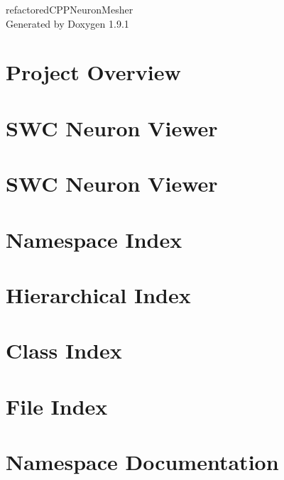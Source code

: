 \let\mypdfximage\pdfximage\def\pdfximage{\immediate\mypdfximage}\documentclass[twoside]{book}
\newcommand{\+}{\discretionary{\mbox{\scriptsize$\hookleftarrow$}}{}{}}
\newcommand{\clearemptydoublepage}{%
  \newpage{\pagestyle{empty}\cleardoublepage}%
}
\begin{document}
\raggedbottom

\hypersetup{pageanchor=false,
             bookmarksnumbered=true,
             pdfencoding=unicode
            }
\begin{titlepage}
\vspace*{7cm}
\begin{center}%
{\Large refactored\+CPPNeuron\+Mesher }\\
\vspace*{1cm}
{\large Generated by Doxygen 1.9.1}\\
\end{center}
\end{titlepage}
\clearemptydoublepage
{}
\tableofcontents
\clearemptydoublepage
{}
\hypersetup{pageanchor=true}

\chapter{Project Overview}
\label{index}\hypertarget{index}{}
\chapter{SWC Neuron Viewer}
\label{md_scripts_app_neuronviewer_README}

\chapter{SWC Neuron Viewer}
\label{md_scripts_README}

\chapter{Namespace Index}

\chapter{Hierarchical Index}

\chapter{Class Index}

\chapter{File Index}

\chapter{Namespace Documentation}














\end{document}
